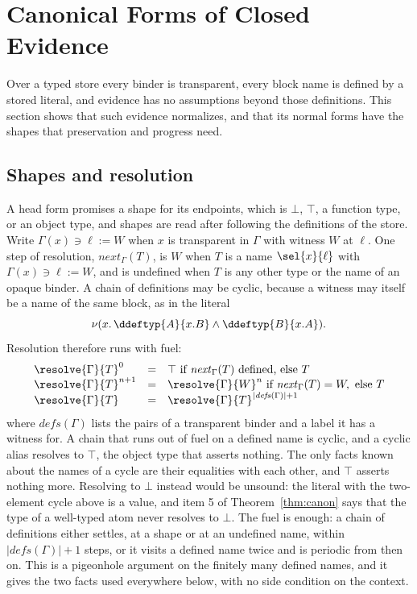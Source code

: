 \section{Canonical Forms of Closed Evidence}\label{sec:canonical}

Over a typed store every binder is transparent, every block name is defined by a stored literal, and evidence has no assumptions beyond those definitions. This section shows that such evidence normalizes, and that its normal forms have the shapes that preservation and progress need.

\subsection{Shapes and resolution}\label{sec:resolution}

A head form promises a shape for its endpoints, which is $\bot$, $\top$, a function type, or an object type, and shapes are read after following the definitions of the store. Write $\Gamma(x) \ni \ell \mathrel{:=} W$ when $x$ is transparent in $\Gamma$ with witness $W$ at $\ell$. One step of resolution, $\mathit{next}_\Gamma(T)$, is $W$ when $T$ is a name $\sel{x}{\ell}$ with $\Gamma(x) \ni \ell \mathrel{:=} W$, and is undefined when $T$ is any other type or the name of an opaque binder. A chain of definitions may be cyclic, because a witness may itself be a name of the same block, as in the literal
\[
\nu(x.\,\ddeftyp{A}{x.B} \wedge \ddeftyp{B}{x.A}) .
\]
Resolution therefore runs with fuel:
\[
\begin{array}{@{}lcl@{}}
\resolve{\Gamma}{T}^{0} & = & \top \text{ if } \mathit{next}_\Gamma(T) \text{ defined, else } T \\
\resolve{\Gamma}{T}^{n+1} & = & \resolve{\Gamma}{W}^{n} \text{ if } \mathit{next}_\Gamma(T) = W, \text{ else } T \\
\resolve{\Gamma}{T} & = & \resolve{\Gamma}{T}^{|\mathit{defs}(\Gamma)| + 1}
\end{array}
\]
where $\mathit{defs}(\Gamma)$ lists the pairs of a transparent binder and a label it has a witness for. A chain that runs out of fuel on a defined name is cyclic, and a cyclic alias resolves to $\top$, the object type that asserts nothing. The only facts known about the names of a cycle are their equalities with each other, and $\top$ asserts nothing more. Resolving to $\bot$ instead would be unsound: the literal with the two-element cycle above is a value, and item 5 of Theorem~\ref{thm:canon} says that the type of a well-typed atom never resolves to $\bot$. The fuel is enough: a chain of definitions either settles, at a shape or at an undefined name, within $|\mathit{defs}(\Gamma)| + 1$ steps, or it visits a defined name twice and is periodic from then on. This is a pigeonhole argument on the finitely many defined names, and it gives the two facts used everywhere below, with no side condition on the context.

